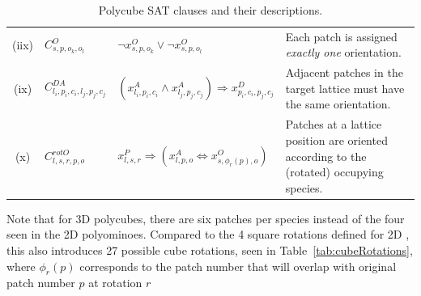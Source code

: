 \begin{table}[h!]
\begin{tabular}{|c|l|l|p{5cm}|}
        (iix) &  \(C^{O}_{s,p,o_k,o_l}\) & \(\neg x_{s, p, o_k}^{O} \lor \neg x_{s, p, o_l}^{O}\) & \small{Each patch is assigned \textit{exactly one} orientation.} \\ %
        (ix) & \(C^{DA}_{l_i,p_i,c_i,l_j,p_j,c_j}\) & \(\left(x_{l_i,p_i,c_i}^{A} \land x_{l_j,p_j,c_j}^{A} \right) \Rightarrow x_{p_i,c_i,p_j,c_j}^{D}\) & \small{Adjacent patches in the target lattice must have the same orientation.} \\ %
        (x) & \(C^{rotO}_{l,s,r,p,o}\) & \(x_{l,s,r}^{P} \Rightarrow \left(x_{l,p,o}^{A} \Leftrightarrow x_{s, \phi_r(p), o}^{O}\right)\) & \small{Patches at a lattice position are oriented according to the (rotated) occupying species.} \\ %
        \hline
    \end{tabular}
    \caption{Polycube SAT clauses and their descriptions.}
    \label{tab:sat_clauses}
    \end{table}

Note that for 3D polycubes, there are six patches per species instead of the four seen in the 2D polyominoes. Compared to the 4 square rotations defined for 2D \cite{romano2020designing}, this also introduces 27 possible cube rotations, seen in Table~\ref{tab:cubeRotations}, where $\phi_r(p)$ corresponds to the patch number that will overlap with original patch number $p$ at rotation $r$

